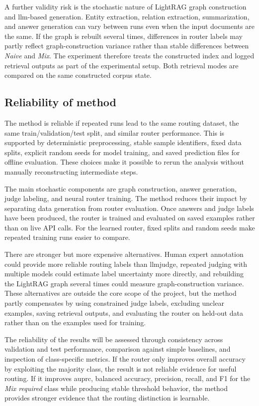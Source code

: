 \documentclass[english, bibtex]{kththesis}               %
\numberwithin{listing}{chapter}
\begin{document}
A further validity risk is the stochastic nature of LightRAG graph construction and \gls{llm}-based generation. Entity extraction, relation extraction, summarization, and answer generation can vary between runs even when the input documents are the same. If the graph is rebuilt several times, differences in router labels may partly reflect graph-construction variance rather than stable differences between \emph{Naive} and \emph{Mix}. The experiment therefore treats the constructed index and logged retrieval outputs as part of the experimental setup. Both retrieval modes are compared on the same constructed corpus state.

\subsection{Reliability of method}
\label{sec:reliabilityOfMethod}

The method is reliable if repeated runs lead to the same routing dataset, the same train/validation/test split, and similar router performance. This is supported by deterministic preprocessing, stable sample identifiers, fixed data splits, explicit random seeds for model training, and saved prediction files for offline evaluation. These choices make it possible to rerun the analysis without manually reconstructing intermediate steps.

The main stochastic components are graph construction, answer generation, judge labeling, and neural router training. The method reduces their impact by separating data generation from router evaluation. Once answers and judge labels have been produced, the router is trained and evaluated on saved examples rather than on live \gls{API} calls. For the learned router, fixed splits and random seeds make repeated training runs easier to compare.

There are stronger but more expensive alternatives. Human expert annotation could provide more reliable routing labels than \gls{llmjudge}, repeated judging with multiple models could estimate label uncertainty more directly, and rebuilding the LightRAG graph several times could measure graph-construction variance. These alternatives are outside the core scope of the project, but the method partly compensates by using constrained judge labels, excluding unclear examples, saving retrieval outputs, and evaluating the router on held-out data rather than on the examples used for training.

The reliability of the results will be assessed through consistency across validation and test performance, comparison against simple baselines, and inspection of class-specific metrics. If the router only improves overall accuracy by exploiting the majority class, the result is not reliable evidence for useful routing. If it improves \gls{auprc}, balanced accuracy, precision, recall, and F1 for the \emph{Mix required} class while producing stable threshold behavior, the method provides stronger evidence that the routing distinction is learnable.
\end{document}
